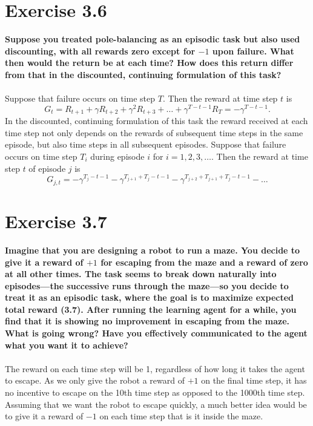 \documentclass[a4paper,11pt]{article}
\numberwithin{equation}{section}
\theoremstyle{remark}
\begin{document}
\section{Exercise 3.6}

\textbf{Suppose you treated pole-balancing as an episodic task but also used discounting, with all rewards zero except for $-1$ upon failure. What then would the return be at each time? How does this return differ from that in the discounted, continuing formulation of this task?}
\\ \\
Suppose that failure occurs on time step $T$. Then the reward at time step $t$ is
\[
	G_t = R_{t+1} + \gamma R_{t+2} + \gamma^2 R_{t+3} + \dots + \gamma^{T - t - 1} R_{T} = -\gamma^{T - t - 1}.
\]
In the discounted, continuing formulation of this task the reward received at each time step not only depends on the rewards of subsequent time steps in the same episode, but also time steps in all subsequent episodes. Suppose that failure occurs on time step $T_i$ during episode $i$ for $i=1, 2, 3, \dots$. Then the reward at time step $t$ of episode $j$ is
\[
	G_{j, t} = -\gamma^{T_j - t - 1}  - \gamma^{T_{j+1} + T_j - t - 1} - \gamma^{T_{j+2} + T_{j+1} + T_j - t - 1} - \dots
\]

\section{Exercise 3.7}

\textbf{Imagine that you are designing a robot to run a maze. You decide to give it a reward of $+1$ for escaping from the maze and a reward of zero at all other times. The task seems to break down naturally into episodes—the successive runs through the maze—so you decide to treat it as an episodic task, where the goal is to maximize expected total reward (3.7). After running the learning agent for a while, you find that it is showing no improvement in escaping from the maze. What is going wrong? Have you effectively communicated to the agent what you want it to achieve?}
\\ \\
The reward on each time step will be 1, regardless of how long it takes the agent to escape. As we only give the robot a reward of $+1$ on the final time step, it has no incentive to escape on the 10th time step as opposed to the 1000th time step. Assuming that we want the robot to escape quickly, a much better idea would be to give it a reward of $-1$ on each time step that is it inside the maze. 
\end{document}
